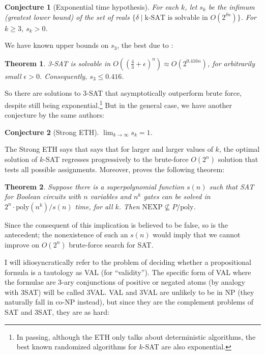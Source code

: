 \documentclass[letterpaper,12pt]{article}
\newtheorem{conjecture}{Conjecture}
\newtheorem{theorem}{Theorem}
\begin{document}
\begin{conjecture}[Exponential time hypothesis]
For each $k$, let $s_k$ be the infimum (greatest lower bound) of the set of reals $\{\delta \mid \text{k-SAT is solvable in } O(2^{\delta n})\}$. For $k \geq 3$, $s_k > 0$.
\end{conjecture}

We have known upper bounds on $s_3$, the best due to \cite{DBLP:journals/corr/abs-1008-4067}:

\begin{theorem}
\label{3SatBound}
3-SAT is solvable in $O((\frac{4}{3} + \epsilon)^{n}) \approx O(2^{0.416n})$, for arbitrarily small $\epsilon > 0$. Consequently, $s_3 \leq 0.416$.
\end{theorem}

So there are solutions to 3-SAT that asymptotically outperform brute force, despite still being exponential.\footnote{In passing, although the ETH only talks about deterministic algorithms, the best known randomized algorithms for $k$-SAT are also exponential.} But in the general case, we have another conjecture by the same authors:

\begin{conjecture}[Strong ETH]
$\lim_{k \to \infty} s_k = 1$.
\end{conjecture}

The Strong ETH says that  says that for larger and larger values of $k$, the optimal solution of $k$-SAT regresses progressively to the brute-force $O(2^n)$ solution that tests all possible assignments. Moreover, \cite{Williams:2010:IES:1806689.1806723} proves the following theorem:

\begin{theorem}
Suppose there is a superpolynomial function $s(n)$ such that SAT for Boolean circuits with $n$ variables and $n^k$ gates can be solved in $2^n \cdot \text{poly}(n^k)/s(n)$ time, for all $k$. Then $\text{NEXP} \not \subseteq P/\text{poly}$.
\end{theorem}

Since the consequent of this implication is believed to be false, so is the antecedent; the nonexistence of such an $s(n)$ would imply that we cannot improve on $O(2^n)$ brute-force search for SAT.

I will idiosyncratically refer to the problem of deciding whether a propositional formula is a tautology as VAL (for ``validity''). The specific form of VAL where the formulae are 3-ary conjunctions of positive or negated atoms (by analogy with 3SAT) will be called 3VAL. VAL and 3VAL are unlikely to be in NP (they naturally fall in co-NP instead), but since they are the complement problems of SAT and 3SAT, they are as hard:
\end{document}
